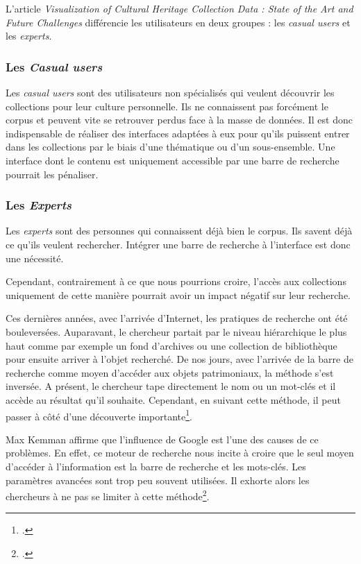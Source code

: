 L'article \textit{Visualization of Cultural Heritage Collection Data : State of the Art and Future Challenges} différencie les utilisateurs en deux groupes : les \textit{casual users} et les \textit{experts}.

\subsubsection{Les \textit{Casual users}}

Les \textit{casual users} sont des utilisateurs non spécialisés qui veulent découvrir les collections pour leur culture personnelle. Ils ne connaissent pas forcément le corpus et peuvent vite se retrouver perdus face à la masse de données. Il est donc indispensable de réaliser des interfaces adaptées à eux pour qu'ils puissent entrer dans les collections par le biais d'une thématique ou d'un sous-ensemble. Une interface dont le contenu est uniquement accessible par une barre de recherche pourrait les pénaliser.

\subsubsection{Les \textit{Experts}}

Les \textit{experts} sont des personnes qui connaissent déjà bien le corpus. Ils savent déjà ce qu'ils veulent rechercher. Intégrer une barre de recherche à l'interface est donc une nécessité.

Cependant, contrairement à ce que nous pourrions croire, l'accès aux collections uniquement de cette manière pourrait avoir un impact négatif sur leur recherche. 

Ces dernières années, avec l'arrivée d'Internet, les pratiques de recherche ont été bouleversées. Auparavant, le chercheur partait par le niveau hiérarchique le plus haut comme par exemple un fond d'archives ou une collection de bibliothèque pour ensuite arriver à l'objet recherché. De nos jours, avec l'arrivée de la barre de recherche comme moyen d'accéder aux objets patrimoniaux, la méthode s'est inversée. A présent, le chercheur tape directement le nom ou un mot-clés et il accède au résultat qu'il souhaite. Cependant, en suivant cette méthode, il peut passer à côté d'une découverte importante\footcite{griveauVisualisationDonneesAu2025}. 

Max Kemman affirme que l'influence de Google est l'une des causes de ce problèmes. En effet, ce moteur de recherche nous incite à croire que le seul moyen d'accéder à l'information est la barre de recherche et les mots-clés. Les paramètres avancées sont trop peu souvent utilisées. Il exhorte alors les chercheurs à ne pas se limiter à cette méthode\footcite{kemmanJustGoogleIt2014}.
